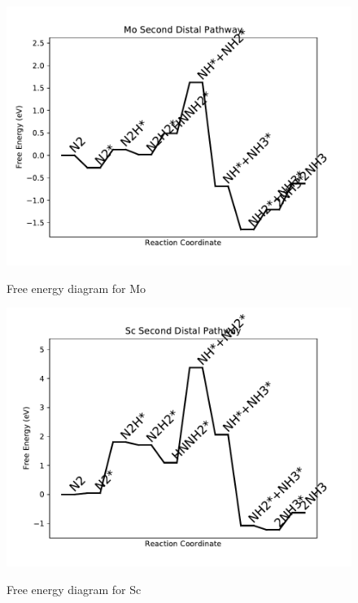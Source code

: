 \documentclass{article}
\begin{document}
\begin{figure}
\includegraphics[width=1\linewidth]{data/plots/Mo_distal_2.pdf}
\label{fig:Mo_distal_2}
\caption{Free energy diagram for Mo}
\end{figure}

\begin{figure}
\includegraphics[width=1\linewidth]{data/plots/Sc_distal_2.pdf}
\label{fig:Sc_distal_2}
\caption{Free energy diagram for Sc}
\end{figure}
\end{document}
